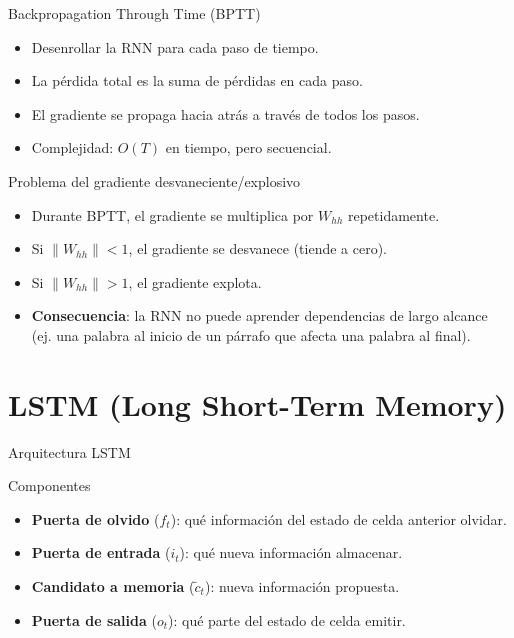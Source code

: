 \documentclass[aspectratio=169, 10pt, xcolor=table]{beamer}
\begin{document}
\begin{frame}{Backpropagation Through Time (BPTT)}
    \begin{itemize}
        \item Desenrollar la RNN para cada paso de tiempo.
        \item La pérdida total es la suma de pérdidas en cada paso.
        \item El gradiente se propaga hacia atrás a través de todos los pasos.
        \item Complejidad: $O(T)$ en tiempo, pero secuencial.
    \end{itemize}
\end{frame}

\begin{frame}{Problema del gradiente desvaneciente/explosivo}
    \begin{itemize}
        \item Durante BPTT, el gradiente se multiplica por $W_{hh}$ repetidamente.
        \item Si $\|W_{hh}\| < 1$, el gradiente se desvanece (tiende a cero).
        \item Si $\|W_{hh}\| > 1$, el gradiente explota.
        \item \textbf{Consecuencia}: la RNN no puede aprender dependencias de largo alcance (ej. una palabra al inicio de un párrafo que afecta una palabra al final).
    \end{itemize}
\end{frame}

\section{LSTM (Long Short-Term Memory)}

\begin{frame}{Arquitectura LSTM}
    \begin{block}{Componentes}
        \begin{itemize}
            \item \textbf{Puerta de olvido} ($f_t$): qué información del estado de celda anterior olvidar.
            \item \textbf{Puerta de entrada} ($i_t$): qué nueva información almacenar.
            \item \textbf{Candidato a memoria} ($\tilde{c}_t$): nueva información propuesta.
            \item \textbf{Puerta de salida} ($o_t$): qué parte del estado de celda emitir.
        \end{itemize}
    \end{block}
\end{frame}
\end{document}
